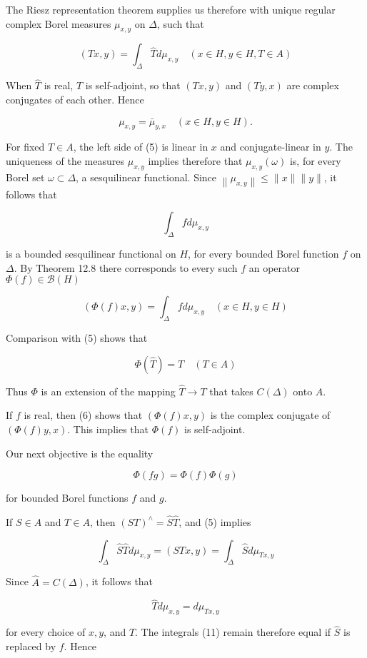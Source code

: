 \documentclass[10pt]{article}
\begin{document}
The Riesz representation theorem supplies us therefore with unique regular complex Borel measures $\mu_{x, y}$ on $\Delta$, such that

$$
(T x, y)=\int_{\Delta} \hat{T} d \mu_{x, y} \quad(x \in H, y \in H, T \in A)
$$

When $\hat{T}$ is real, $T$ is self-adjoint, so that $(T x, y)$ and $(T y, x)$ are complex conjugates of each other. Hence

$$
\mu_{x, y}=\bar{\mu}_{y, x} \quad(x \in H, y \in H) .
$$

For fixed $T \in A$, the left side of (5) is linear in $x$ and conjugate-linear in $y$. The uniqueness of the measures $\mu_{x, y}$ implies therefore that $\mu_{x, y}(\omega)$ is, for every Borel set $\omega \subset \Delta$, a sesquilinear functional. Since $\left\|\mu_{x, y}\right\| \leq\|x\|\|y\|$, it follows that

$$
\int_{\Delta} f d \mu_{x, y}
$$

is a bounded sesquilinear functional on $H$, for every bounded Borel function $f$ on $\Delta$. By Theorem 12.8 there corresponds to every such $f$ an operator $\Phi(f) \in \mathscr{B}(H)$

$$
(\Phi(f) x, y)=\int_{\Delta} f d \mu_{x, y} \quad(x \in H, y \in H)
$$

Comparison with (5) shows that

$$
\Phi(\hat{T})=T \quad(T \in A)
$$

Thus $\Phi$ is an extension of the mapping $\hat{T} \rightarrow T$ that takes $C(\Delta)$ onto $A$.

If $f$ is real, then (6) shows that $(\Phi(f) x, y)$ is the complex conjugate of $(\Phi(f) y, x)$. This implies that $\Phi(f)$ is self-adjoint.

Our next objective is the equality

$$
\Phi(f g)=\Phi(f) \Phi(g)
$$

for bounded Borel functions $f$ and $g$.

If $S \in A$ and $T \in A$, then $(S T)^{\wedge}=\hat{S} \hat{T}$, and (5) implies

$$
\int_{\Delta} \hat{S} \hat{T} d \mu_{x, y}=(S T x, y)=\int_{\Delta} \hat{S} d \mu_{T x, y}
$$

Since $\hat{A}=C(\Delta)$, it follows that

$$
\widehat{T} d \mu_{x, y}=d \mu_{T x, y}
$$

for every choice of $x, y$, and $T$. The integrals (11) remain therefore equal if $\hat{S}$ is replaced by $f$. Hence
\end{document}
